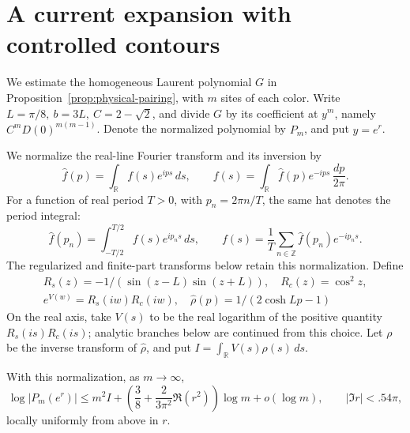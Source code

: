 \section{A current expansion with controlled contours}\label{c6:gas}

We estimate the homogeneous Laurent polynomial \(G\) in Proposition~\ref{prop:physical-pairing}, with \(m\) sites of each color. Write \(L=\pi/8,\ b=3L,\ C=2-\sqrt2\), and divide \(G\) by its coefficient at \(y^m\), namely \(C^mD(0)^{m(m-1)}\). Denote the normalized polynomial by \(P_m\), and put \(y=e^r\).

We normalize the real-line Fourier transform and its inversion by
\[
 \widehat f(p)=\int_{\mathbb R}f(s)e^{ips}\,ds,\qquad
 f(s)=\int_{\mathbb R}\widehat f(p)e^{-ips}\,\frac{dp}{2\pi}.
\]
For a function of real period \(T>0\), with \(p_n=2\pi n/T\), the same hat denotes the period integral:
\[
 \widehat f(p_n)=\int_{-T/2}^{T/2}f(s)e^{ip_ns}\,ds,\qquad
 f(s)=\frac1T\sum_{n\in\mathbb Z}\widehat f(p_n)e^{-ip_ns}.
\]
The regularized and finite-part transforms below retain this normalization. Define
\[
 \begin{gathered}
 R_s(z)=-1/(\sin(z-L)\sin(z+L)),\quad R_c(z)=\cos^2 z,\\
 e^{V(w)}=R_s(iw)R_c(iw),\quad
 \widehat\rho(p)=1/(2\cosh Lp-1)
 \end{gathered}
\]
On the real axis, take \(V(s)\) to be the real logarithm of the positive
quantity \(R_s(is)R_c(is)\); analytic branches below are continued from
this choice. Let \(\rho\) be the inverse transform of
\(\widehat\rho\), and put \(I=\int_{\mathbb R}V(s)\rho(s)\,ds\).

\begin{proposition}\label{prop:gas-upper}
With this normalization, as \(m\to\infty\),
\[
 \log|P_m(e^r)|\le m^2I+
 \left(\frac38+\frac{2}{3\pi^2}\Re(r^2)\right)\log m+o(\log m),
 \qquad |\Im r|<.54\pi,
\]
locally uniformly from above in \(r\).
\end{proposition}

